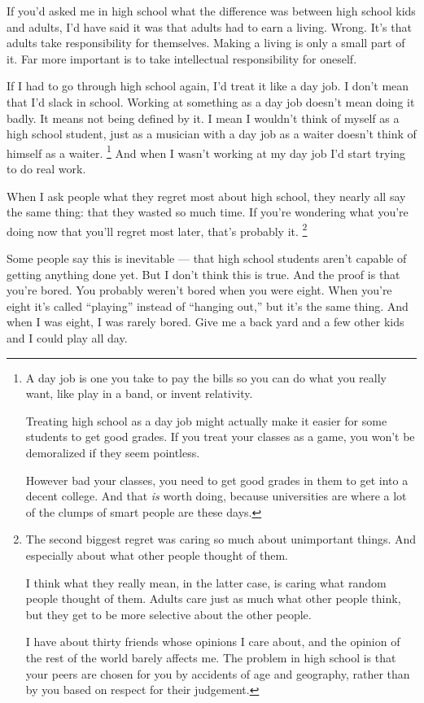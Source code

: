 \documentclass[12pt]{book}
\begin{document}
If you'd asked me in high school what the difference was between high
school kids and adults, I'd have said it was that adults had to earn a
living. Wrong. It's that adults take responsibility for themselves.
Making a living is only a small part of it. Far more important is to
take intellectual responsibility for oneself.

If I had to go through high school again, I'd treat it like a day job. I
don't mean that I'd slack in school. Working at something as a day job
doesn't mean doing it badly. It means not being defined by it. I mean I
wouldn't think of myself as a high school student, just as a musician
with a day job as a waiter doesn't think of himself as a waiter. \footnote{A day job is one you take to pay the bills so you can do what
you really want, like play in a band, or invent relativity.

Treating high school as a day job might actually make it easier for some
students to get good grades. If you treat your classes as a game, you
won't be demoralized if they seem pointless.

However bad your classes, you need to get good grades in them to get
into a decent college. And that \emph{is} worth doing, because
universities are where a lot of the clumps of smart people are these
days.}
And when I wasn't working at my day job I'd start trying to do real
work.

When I ask people what they regret most about high school, they nearly
all say the same thing: that they wasted so much time. If you're
wondering what you're doing now that you'll regret most later, that's
probably it. \footnote{The second biggest regret was caring so much about unimportant
things. And especially about what other people thought of them.

I think what they really mean, in the latter case, is caring what random
people thought of them. Adults care just as much what other people
think, but they get to be more selective about the other people.

I have about thirty friends whose opinions I care about, and the opinion
of the rest of the world barely affects me. The problem in high school
is that your peers are chosen for you by accidents of age and geography,
rather than by you based on respect for their judgement.}

Some people say this is inevitable --- that high school students aren't
capable of getting anything done yet. But I don't think this is true.
And the proof is that you're bored. You probably weren't bored when you
were eight. When you're eight it's called ``playing'' instead of
``hanging out,'' but it's the same thing. And when I was eight, I was
rarely bored. Give me a back yard and a few other kids and I could play
all day.
\end{document}
